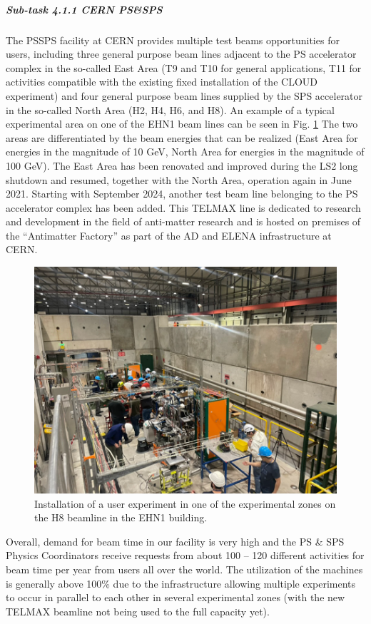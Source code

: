 \subparagraph{Sub-task 4.1.1 CERN PS\&SPS} \mbox{}

The PSSPS facility at CERN provides multiple test beams opportunities for users, including three general purpose beam lines adjacent to the PS accelerator complex in the so-called East Area (T9 and T10 for general applications, T11 for activities compatible with the existing fixed installation of the CLOUD experiment) and four general purpose beam lines supplied by the SPS accelerator in the so-called North Area (H2, H4, H6, and H8). An example of a typical experimental area on one of the EHN1 beam lines can be seen in Fig. \ref{fig:4.1.1} The two areas are differentiated by the beam energies that can be realized (East Area for energies in the magnitude of 10 GeV, North Area for energies in the magnitude of 100 GeV). The East Area has been renovated and improved during the LS2 long shutdown and resumed, together with the North Area, operation again in June 2021. Starting with September 2024, another test beam line belonging to the PS accelerator complex has been added. This TELMAX line is dedicated to research and development in the field of anti-matter research and is hosted on premises of the “Antimatter Factory” as part of the AD and ELENA infrastructure at CERN. 

\begin{figure}[!h]
    \centering
    \includegraphics[width=0.75\linewidth]{image.png}
    \caption{Installation of a user experiment in one of the experimental zones on the H8 beamline in the EHN1 building.}
    \label{fig:4.1.1}
\end{figure}

Overall, demand for beam time in our facility is very high and the PS \& SPS Physics Coordinators receive requests from about 100 – 120 different activities for beam time per year from users all over the world. The utilization of the machines is generally above 100\% due to the infrastructure allowing multiple experiments to occur in parallel to each other in several experimental zones (with the new TELMAX beamline not being used to the full capacity yet).

